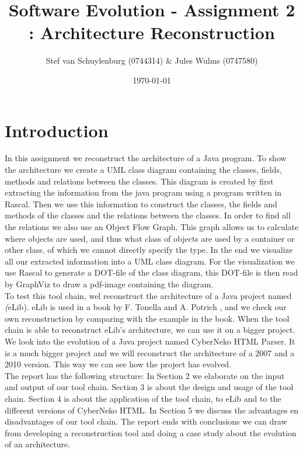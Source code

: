 \documentclass[a4paper,11pt]{article}
\title{Software Evolution - Assignment 2 : Architecture Reconstruction}
\author{Stef van Schuylenburg (0744314) \& Jules Wulms (0747580)}
\date{\today}
\begin{document}
	\maketitle

	\section{Introduction}
		In this assignment we reconstruct the architecture of a Java program. To show the architecture we create a UML class diagram containing the classes, fields, methods and relations between the classes. This diagram is created by first extracting the information from the java program using a program written in Rascal\cite{rascal}.	Then we use this information to construct the classes, the fields and methods of the classes and the relations between the classes. In order to find all the relations we also use an Object Flow Graph. This graph allows us to calculate where objects are used, and thus what class of objects are used by a container or other class, of which we cannot directly specify the type. In the end we visualize all our extracted information into a UML class diagram. For the visualization we use Rascal to generate a DOT-file of the class diagram, this DOT-file is then read by GraphViz\cite{graphviz} to draw a pdf-image containing the diagram. \\

		To test this tool chain, wel reconstruct the architecture of a Java project named \textit(eLib). eLib is used in a book by F. Tonella and A. Potrich \cite{tonella}, and we check our own reconstruction by comparing with the example in the book. When the tool chain is able to reconstruct eLib's architecture, we can use it on a bigger project. We look into the evolution of a Java project named CyberNeko HTML Parser. It is a much bigger project and we will reconstruct the architecture of a 2007 and a 2010 version. This way we can see how the project has evolved. \\

		The report has the following structure: In Section 2 we elaborate on the input and output of our tool chain. Section 3 is about the design and usage of the tool chain. Section 4 is about the application of the tool chain, to eLib and to the different versions of CyberNeko HTML. In Section 5 we discuss the advantages en disadvantages of our tool chain. The report ends with conclusions we can draw from developing a reconstruction tool and doing a case study about the evolution of an architecture.
	
\end{document}
